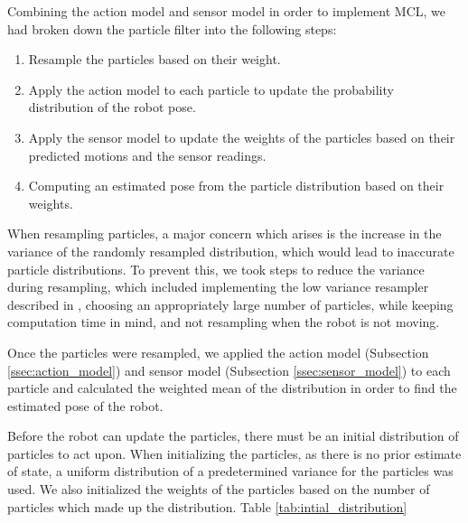 \documentclass[journal]{IEEEtran}
\begin{document}
            
            Combining the action model and sensor model in order to implement MCL, we had broken down the particle filter into the following steps:
            
            \begin{enumerate}
                \item Resample the particles based on their weight.
                \item Apply the action model to each particle to update the probability distribution of the robot pose.
                \item Apply the sensor model to update the weights of the particles based on their predicted motions and the sensor readings.
                \item Computing an estimated pose from the particle distribution based on their weights.
            \end{enumerate}
            
            When resampling particles, a major concern which arises is the increase in the variance of the randomly resampled distribution, which would lead to inaccurate particle distributions. To prevent this, we took steps to reduce the variance during resampling, which included implementing the low variance resampler described in \cite{Prob_Rob}, choosing an appropriately large number of particles, while keeping computation time in mind, and not resampling when the robot is not moving. 
            
            Once the particles were resampled, we applied the action model (Subsection \ref{ssec:action_model}) and sensor model (Subsection \ref{ssec:sensor_model}) to each particle and calculated the weighted mean of the distribution in order to find the estimated pose of the robot.  %
            
            Before the robot can update the particles, there must be an initial distribution of particles to act upon. When initializing the particles, as there is no prior estimate of state, a uniform distribution of a predetermined variance for the particles was used. We also initialized the weights of the particles based on the number of particles which made up the distribution. Table \ref{tab:intial_distribution} 
            
\end{document}
